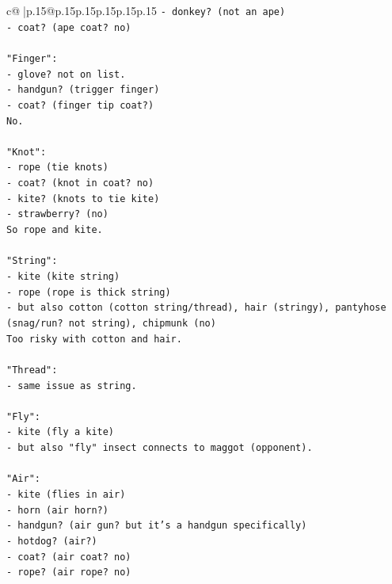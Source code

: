 \documentclass{article}
\begin{document}
{\begin{supertabular}{c@{$\;$}|p{.15\linewidth}@{}p{.15\linewidth}p{.15\linewidth}p{.15\linewidth}p{.15\linewidth}p{.15\linewidth}}
{{{\texttt{{-} donkey? (not an ape)} \\
\texttt{{-} coat? (ape coat? no)} \\
\\ 
\texttt{"Finger":} \\
\texttt{{-} glove? not on list.} \\
\texttt{{-} handgun? (trigger finger)} \\
\texttt{{-} coat? (finger tip coat?)} \\
\texttt{No.} \\
\\ 
\texttt{"Knot":} \\
\texttt{{-} rope (tie knots)} \\
\texttt{{-} coat? (knot in coat? no)} \\
\texttt{{-} kite? (knots to tie kite)} \\
\texttt{{-} strawberry? (no)} \\
\texttt{So rope and kite.} \\
\\ 
\texttt{"String":} \\
\texttt{{-} kite (kite string)} \\
\texttt{{-} rope (rope is thick string)} \\
\texttt{{-} but also cotton (cotton string/thread), hair (stringy), pantyhose (snag/run? not string), chipmunk (no)} \\
\texttt{Too risky with cotton and hair.} \\
\\ 
\texttt{"Thread":} \\
\texttt{{-} same issue as string.} \\
\\ 
\texttt{"Fly":} \\
\texttt{{-} kite (fly a kite)} \\
\texttt{{-} but also "fly" insect connects to maggot (opponent).} \\
\\ 
\texttt{"Air":} \\
\texttt{{-} kite (flies in air)} \\
\texttt{{-} horn (air horn?)} \\
\texttt{{-} handgun? (air gun? but it's a handgun specifically)} \\
\texttt{{-} hotdog? (air?)} \\
\texttt{{-} coat? (air coat? no)} \\
\texttt{{-} rope? (air rope? no)} \\
}}}
\end{supertabular}}
\end{document}
